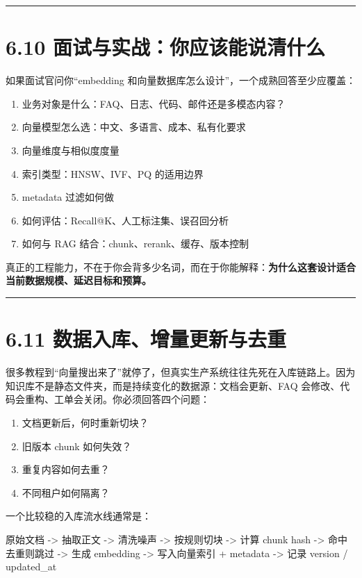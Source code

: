 \bigskip\hrule\bigskip

\section{6.10 面试与实战：你应该能说清什么}

如果面试官问你``embedding 和向量数据库怎么设计''，一个成熟回答至少应覆盖：


\begin{enumerate}[leftmargin=2em]
\item 业务对象是什么：FAQ、日志、代码、邮件还是多模态内容？
\item 向量模型怎么选：中文、多语言、成本、私有化要求
\item 向量维度与相似度度量
\item 索引类型：HNSW、IVF、PQ 的适用边界
\item metadata 过滤如何做
\item 如何评估：Recall@K、人工标注集、误召回分析
\item 如何与 RAG 结合：chunk、rerank、缓存、版本控制
\end{enumerate}

真正的工程能力，不在于你会背多少名词，而在于你能解释：\textbf{为什么这套设计适合当前数据规模、延迟目标和预算。}


\bigskip\hrule\bigskip

\section{6.11 数据入库、增量更新与去重}

很多教程到``向量搜出来了''就停了，但真实生产系统往往先死在入库链路上。因为知识库不是静态文件夹，而是持续变化的数据源：文档会更新、FAQ 会修改、代码会重构、工单会关闭。你必须回答四个问题：


\begin{enumerate}[leftmargin=2em]
\item 文档更新后，何时重新切块？
\item 旧版本 chunk 如何失效？
\item 重复内容如何去重？
\item 不同租户如何隔离？
\end{enumerate}

一个比较稳的入库流水线通常是：


\begin{codeblock}
原始文档
  -> 抽取正文
  -> 清洗噪声
  -> 按规则切块
  -> 计算 chunk hash
  -> 命中去重则跳过
  -> 生成 embedding
  -> 写入向量索引 + metadata
  -> 记录 version / updated_at
\end{codeblock}

